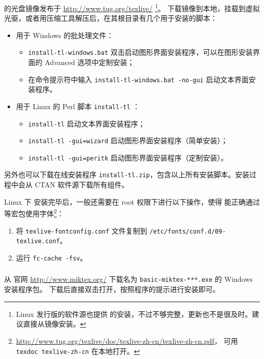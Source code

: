 \subsubsection{}

 的光盘镜像发布于 \url{http://www.tug.org/texlive/}%
\footnote{Linux 发行版的软件源也提供  的安装，不过不够完整，更新也不是很及时。建议直接从镜像安装。}。
下载镜像到本地，挂载到虚拟光驱，或者用压缩工具解压后，在其根目录有几个用于安装的脚本：
\begin{itemize}
  \item 用于 Windows 的批处理文件：
  \begin{itemize}
    \item \texttt{install-tl-windows.bat} 双击启动图形界面安装程序，可以在图形安装界面的 Advanced 选项中定制安装；
    \item 在命令提示符中输入 \texttt{install-tl-windows.bat -no-gui} 启动文本界面安装程序。
  \end{itemize}
  \item 用于 Linux 的 Perl 脚本 \texttt{install-tl} ：
  \begin{itemize}
    \item \texttt{install-tl} 启动文本界面安装程序；
    \item \texttt{install-tl -gui=wizard} 启动图形界面安装程序（简单安装）；
    \item \texttt{install-tl -gui=peritk} 启动图形界面安装程序（定制安装）。
  \end{itemize}
\end{itemize}
另外也可以下载在线安装程序 \texttt{install-tl.zip}，包含以上所有安装脚本。安装过程中会从 CTAN 软件源下载所有组件。

Linux 下  安装完毕后，一般还需要在 root 权限下进行以下操作，使得  能正确通过 
等宏包使用字体\footnote{\url{http://www.tug.org/texlive/doc/texlive-zh-cn/texlive-zh-cn.pdf}，%
可用 \texttt{texdoc texlive-zh-cn} 在本地打开。}：
\begin{enumerate}
  \item 将 \texttt{texlive-fontconfig.conf} 文件复制到 \texttt{/etc/fonts/conf.d/09-texlive.conf}。
  \item 运行 \texttt{fc-cache -fsv}。
\end{enumerate}

\subsubsection{}
从  官网 \url{http://www.miktex.org/} 下载名为 \texttt{basic-miktex-***.exe} 的 Windows 安装程序包。
下载后直接双击打开，按照程序的提示进行安装即可。

